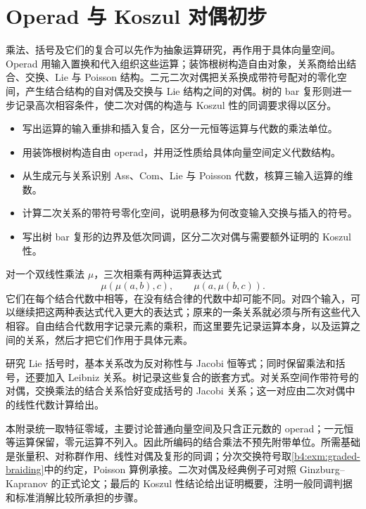 
\chapter{Operad 与 Koszul 对偶初步}
\label{b4:app:G}

\begin{chapterabstract}
	乘法、括号及它们的复合可以先作为抽象运算研究，再作用于具体向量空间。Operad 用输入置换和代入组织这些运算；装饰根树构造自由对象，关系商给出结合、交换、Lie 与 Poisson 结构。二元二次对偶把关系换成带符号配对的零化空间，产生结合结构的自对偶及交换与 Lie 结构之间的对偶。树的 bar 复形则进一步记录高次相容条件，使二次对偶的构造与 Koszul 性的同调要求得以区分。
\end{chapterabstract}

\begin{learninggoals}
	\begin{itemize}
		\item 写出运算的输入重排和插入复合，区分一元恒等运算与代数的乘法单位。
		\item 用装饰根树构造自由 operad，并用泛性质给具体向量空间定义代数结构。
		\item 从生成元与关系识别 Ass、Com、Lie 与 Poisson 代数，核算三输入运算的维数。
		\item 计算二次关系的带符号零化空间，说明悬移为何改变输入交换与插入的符号。
		\item 写出树 bar 复形的边界及低次同调，区分二次对偶与需要额外证明的 Koszul 性。
	\end{itemize}
\end{learninggoals}

对一个双线性乘法 \(\mu\)，三次相乘有两种运算表达式
\[
	\mu(\mu(a,b),c),\qquad \mu(a,\mu(b,c)).
\]
它们在每个结合代数中相等，在没有结合律的代数中却可能不同。对四个输入，可以继续把这两种表达式代入更大的表达式；原来的一条关系就必须与所有这些代入相容。自由结合代数用字记录元素的乘积，而这里要先记录运算本身，以及运算之间的关系，然后才把它们作用于具体元素。

\ProseParagraphBreak
研究 Lie 括号时，基本关系改为反对称性与 Jacobi 恒等式；同时保留乘法和括号，还要加入 Leibniz 关系。树记录这些复合的嵌套方式。对关系空间作带符号的对偶，交换乘法的结合关系恰好变成括号的 Jacobi 关系；这一对应由二次对偶中的线性代数计算给出。

\ProseParagraphBreak
本附录统一取特征零域，主要讨论普通向量空间及只含正元数的 operad；一元恒等运算保留，零元运算不列入。因此所编码的结合乘法不预先附带单位。所需基础是张量积、对称群作用、线性对偶及复形的同调；分次交换符号取\cref{b4:exm:graded-braiding}中的约定，Poisson 算例承接。二次对偶及经典例子可对照 Ginzburg--Kapranov 的正式论文\cite[Sections 1.2, 2.1]{GinzburgKapranov1994KoszulOperads}；最后的 Koszul 性结论给出证明概要，注明一般同调判据和标准消解比较所承担的步骤\cite[Sections 4.1--4.2]{GinzburgKapranov1994KoszulOperads}。

